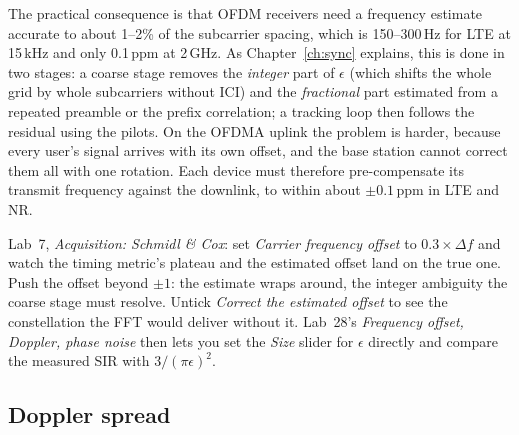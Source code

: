 
The practical consequence is that OFDM receivers need a frequency estimate accurate to about 1--2\% of the
subcarrier spacing, which is 150--300\,Hz for LTE at 15\,kHz and only 0.1\,ppm at 2\,GHz. As
Chapter~\ref{ch:sync} explains, this is done in two stages: a coarse stage removes the \emph{integer} part of
$\epsilon$ (which shifts the whole grid by whole subcarriers without ICI) and the \emph{fractional} part
estimated from a repeated preamble or the prefix correlation; a tracking loop then follows the residual using
the pilots. On the OFDMA uplink the problem is harder, because every user's signal arrives with its own
offset, and the base station cannot correct them all with one rotation. Each device must therefore
pre-compensate its transmit frequency against the downlink, to within about $\pm0.1$\,ppm in LTE and NR.

\begin{tryit}
Lab~7, \emph{Acquisition: Schmidl \& Cox}: set \emph{Carrier frequency offset} to $0.3\times\Delta f$
and watch the timing metric's plateau and the estimated offset land on the true one. Push the
offset beyond $\pm1$: the estimate wraps around, the integer ambiguity the coarse stage must
resolve. Untick \emph{Correct the estimated offset} to see the constellation the FFT would deliver
without it. Lab~28's \emph{Frequency offset, Doppler, phase noise} then lets you set the
\emph{Size} slider for $\epsilon$ directly and compare the measured SIR with $3/(\pi\epsilon)^2$.
\end{tryit}

\subsection{Doppler spread}

